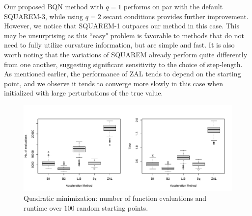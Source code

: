 \documentclass{statsoc}
\begin{document}
Our proposed BQN method with $q=1$ performs on par with the default SQUAREM-3, while using  $q=2$ secant conditions provides further  improvement. However, we notice that SQUAREM-1 outpaces our method in this case. This may be unsurprising as this ``easy" problem is favorable to methods that do not need to fully utilize curvature information, but are simple and fast. 
It is also worth noting that the variations of SQUAREM already perform quite differently from one another, suggesting significant  sensitivity to the choice of step-length. As mentioned earlier, the performance of ZAL tends to depend on the starting point, and we observe it tends to converge more slowly in this case when initialized with large perturbations of the true value.  






\begin{figure}[!htbp]
    \centering
    \includegraphics[width = \textwidth]{plots/quad-boxplot_sd1e3.pdf}
    \caption{Quadratic minimization: number of function  evaluations and runtime over $100$ random starting points. %
    }
    \label{fig:quad_boxplot}
\end{figure}
\end{document}
